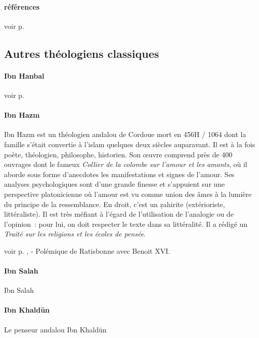 \paragraph{références}
voir p. 


\subsection{Autres théologiens classiques}

\paragraph{Ibn Hanbal}

voir p. \pageref{Theol:IbnHanbal1}


 \paragraph{Ibn Hazm} \label{Theol:IbnHazm}{Ibn Hazm est un théologien andalou de Cordoue mort en 456H / 1064 dont
la famille s'était convertie à l'islam quelques deux siècles auparavant.
Il est à la fois poète, théologien, philosophe, historien. Son œuvre
comprend près de 400 ouvrages dont le fameux \emph{Collier de la colombe
sur l'amour et les amants}, où il aborde sous forme d'anecdotes les
manifestations et signes de l'amour. Ses analyses psychologiques sont
d'une grande finesse et s'appuient sur une perspective platonicienne où
l'amour est vu comme union des âmes à la lumière du principe de la
ressemblance. En droit, c'est un ẓahirite (extérioriste, littéraliste).
Il est très méfiant à l'égard de l'utilisation de l'analogie ou de
l'opinion~: pour lui, on doit respecter le texte dans sa littéralité. Il
a rédigé un \emph{Traité sur les religions et les écoles de pensée}. }

voir p. \pageref{Theol:IbnHazm1}, \pageref{Theol:IbnHazm2} - Polémique de Ratisbonne avec Benoit XVI.
\paragraph{Ibn Salah}
Ibn Salah
\pageref{Ibnsalah1}
\paragraph{Ibn Khaldūn}
Le penseur andalou Ibn Khaldūn \pageref{theol:IbnKhaldun} 
